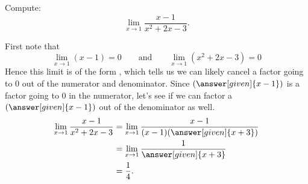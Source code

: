 \documentclass{ximera}
\begin{document}
\begin{example}
  Compute:
  \[
  \lim_{x\to1}\frac{x-1}{x^2+2x-3}.
  \]
  \begin{explanation}
    First note that
    \[
    \lim_{x\to1}\left(x-1\right)=0 \qquad\text{and}\qquad  \lim_{x\to1}\left(x^2+2x-3\right) = 0
    \]
    Hence this limit is of the form \zeroOverZero, which tells us we
    can likely cancel a factor going to $0$ out of the numerator and
    denominator.  Since $(\answer[given]{x-1})$ is a factor going to $0$ in the
    numerator, let's see if we can factor a $(\answer[given]{x-1})$ out of the
    denominator as well.
    \begin{align*}
      \lim_{x\to1}\frac{x-1}{x^2+2x-3}&=\lim_{x\to1}\frac{x-1}{(x-1)(\answer[given]{x+3})} \\
      &=\lim_{x\to1}\frac{1}{\answer[given]{x+3}}\\
      &=\frac{1}{4}.
    \end{align*}
  \end{explanation}
\end{example}
\end{document}
